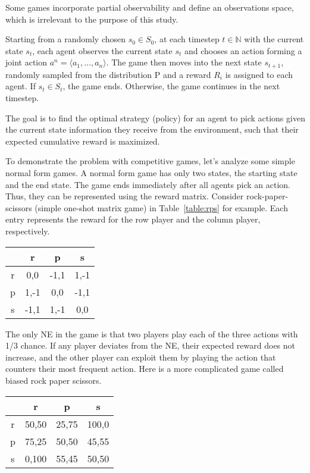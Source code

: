 \documentclass[a4paper]{article}
\begin{document}
\begin{multicols}{2}
\begin{itemize}
    Some games incorporate partial observability and define an observations space, which is irrelevant to the purpose of this study.
\end{itemize}

 Starting from a randomly chosen $s_0 \in S_0$, at each timestep $t \in \mathbb{N}$ with the current state $s_t$, each agent observes the current state $s_t$ and chooses an action forming a joint action $a^n=\langle a_1,\ldots,a_n \rangle$. The game then moves into the next state $s_{t+1}$, randomly sampled from the distribution P and a reward $R_i$ is assigned to each agent. If $s_t \in S_t$, the game ends. Otherwise, the game continues in the next timestep.

The goal is to find the optimal strategy (policy) for an agent to pick actions given the current state information they receive from the environment, such that their expected cumulative reward is maximized.

To demonstrate the problem with competitive games, let's analyze some simple normal form games. A normal form game has only two states, the starting state and the end state. The game ends immediately after all agents pick an action. Thus, they can be represented using the reward matrix. Consider rock-paper-scissors (simple one-shot matrix game) in Table~\ref{table:rps} for example. Each entry represents the reward for the row player and the column player, respectively.

\noindent
\begin{minipage}{\columnwidth}
\label{table:rps}
\centering
\begin{tabular}{c|ccc}
    & r & p & s\\
    \hline
    r & 0,0 & -1,1 & 1,-1 \\
    p & 1,-1 & 0,0 & -1,1 \\
    s & -1,1 & 1,-1 & 0,0 \\
\end{tabular}
\end{minipage}

The only NE in the game is that two players play each of the three actions with 1/3 chance. If any player deviates from the NE, their expected reward does not increase, and the other player can exploit them by playing the action that counters their most frequent action. Here is a more complicated game called biased rock paper scissors.

\noindent
\begin{minipage}{\columnwidth}
\label{table:biasedrps}
\centering
\begin{tabular}{c|ccc}
    & r & p & s\\
    \hline
    r & 50,50 & 25,75 & 100,0 \\
    p & 75,25 & 50,50 & 45,55 \\
    s & 0,100 & 55,45 & 50,50 \\
\end{tabular}
\end{minipage}


\end{multicols}
\end{document}
